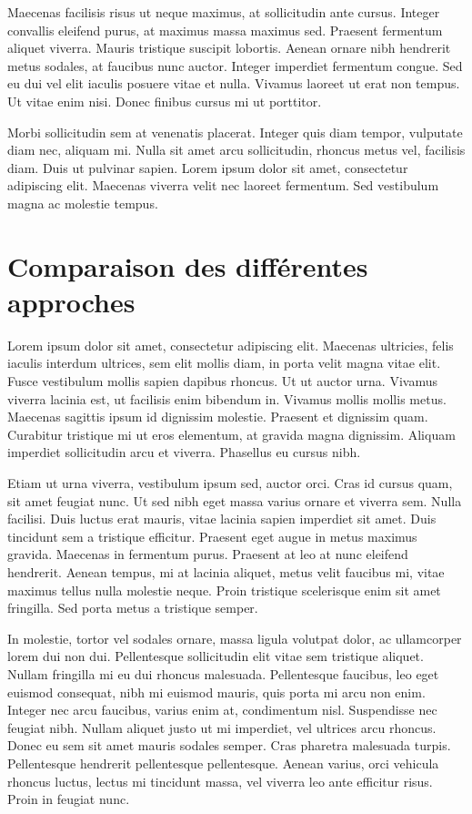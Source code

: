 Maecenas facilisis risus ut neque maximus, at sollicitudin ante cursus. Integer convallis eleifend purus, at maximus massa maximus sed. Praesent fermentum aliquet viverra. Mauris tristique suscipit lobortis. Aenean ornare nibh hendrerit metus sodales, at faucibus nunc auctor. Integer imperdiet fermentum congue. Sed eu dui vel elit iaculis posuere vitae et nulla. Vivamus laoreet ut erat non tempus. Ut vitae enim nisi. Donec finibus cursus mi ut porttitor.

Morbi sollicitudin sem at venenatis placerat. Integer quis diam tempor, vulputate diam nec, aliquam mi. Nulla sit amet arcu sollicitudin, rhoncus metus vel, facilisis diam. Duis ut pulvinar sapien. Lorem ipsum dolor sit amet, consectetur adipiscing elit. Maecenas viverra velit nec laoreet fermentum. Sed vestibulum magna ac molestie tempus. 

\section{Comparaison des différentes approches}



Lorem ipsum dolor sit amet, consectetur adipiscing elit. Maecenas ultricies, felis iaculis interdum ultrices, sem elit mollis diam, in porta velit magna vitae elit. Fusce vestibulum mollis sapien dapibus rhoncus. Ut ut auctor urna. Vivamus viverra lacinia est, ut facilisis enim bibendum in. Vivamus mollis mollis metus. Maecenas sagittis ipsum id dignissim molestie. Praesent et dignissim quam. Curabitur tristique mi ut eros elementum, at gravida magna dignissim. Aliquam imperdiet sollicitudin arcu et viverra. Phasellus eu cursus nibh.

Etiam ut urna viverra, vestibulum ipsum sed, auctor orci. Cras id cursus quam, sit amet feugiat nunc. Ut sed nibh eget massa varius ornare et viverra sem. Nulla facilisi. Duis luctus erat mauris, vitae lacinia sapien imperdiet sit amet. Duis tincidunt sem a tristique efficitur. Praesent eget augue in metus maximus gravida. Maecenas in fermentum purus. Praesent at leo at nunc eleifend hendrerit. Aenean tempus, mi at lacinia aliquet, metus velit faucibus mi, vitae maximus tellus nulla molestie neque. Proin tristique scelerisque enim sit amet fringilla. Sed porta metus a tristique semper.

In molestie, tortor vel sodales ornare, massa ligula volutpat dolor, ac ullamcorper lorem dui non dui. Pellentesque sollicitudin elit vitae sem tristique aliquet. Nullam fringilla mi eu dui rhoncus malesuada. Pellentesque faucibus, leo eget euismod consequat, nibh mi euismod mauris, quis porta mi arcu non enim. Integer nec arcu faucibus, varius enim at, condimentum nisl. Suspendisse nec feugiat nibh. Nullam aliquet justo ut mi imperdiet, vel ultrices arcu rhoncus. Donec eu sem sit amet mauris sodales semper. Cras pharetra malesuada turpis. Pellentesque hendrerit pellentesque pellentesque. Aenean varius, orci vehicula rhoncus luctus, lectus mi tincidunt massa, vel viverra leo ante efficitur risus. Proin in feugiat nunc.

